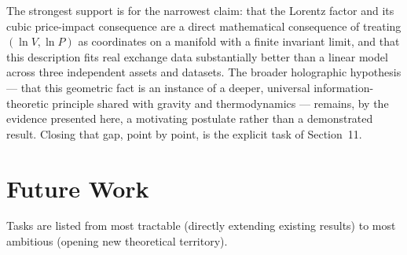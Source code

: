 \documentclass[12pt,a4paper]{article}
\begin{document}
The strongest support is for the narrowest claim: that the Lorentz factor
and its cubic price-impact consequence are a direct mathematical
consequence of treating $(\ln V,\ln P)$ as coordinates on a manifold with
a finite invariant limit, and that this description fits real exchange
data substantially better than a linear model across three independent
assets and datasets. The broader holographic hypothesis --- that this
geometric fact is an instance of a deeper, universal information-theoretic
principle shared with gravity and thermodynamics --- remains, by the
evidence presented here, a motivating postulate rather than a demonstrated
result. Closing that gap, point by point, is the explicit task of
Section~11.


\section{Future Work}
\label{sec:future}

Tasks are listed from most tractable (directly extending existing results)
to most ambitious (opening new theoretical territory).
\end{document}
